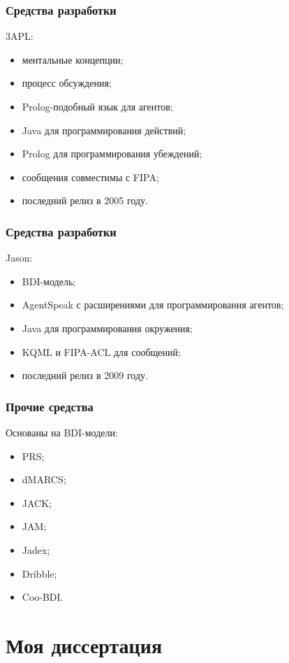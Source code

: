 \documentclass{beamer}
\begin{document}
\begin{frame}
  \frametitle{Средства разработки}
  3APL:
  \begin{itemize}
    \item ментальные концепции;
    \item процесс обсуждения;
    \item Prolog-подобный язык для агентов;
    \item Java для программирования действий;
    \item Prolog для программирования убеждений;
    \item сообщения совместимы с FIPA;
    \item последний релиз в 2005 году.
  \end{itemize}
\end{frame}

\begin{frame}
  \frametitle{Средства разработки}
  Jason:
  \begin{itemize}
    \item BDI-модель;
    \item AgentSpeak с расширениями для программирования агентов;
    \item Java для программирования окружения;
    \item KQML и FIPA-ACL для сообщений;
    \item последний релиз в 2009 году.
  \end{itemize}
\end{frame}

\begin{frame}
  \frametitle{Прочие средства}
  Основаны на BDI-модели:
  \begin{itemize}
    \item PRS;
    \item dMARCS;
    \item JACK;
    \item JAM;
    \item Jadex;
    \item Dribble;
    \item Coo-BDI.
  \end{itemize}
\end{frame}

\section{Моя диссертация}
\end{document}

